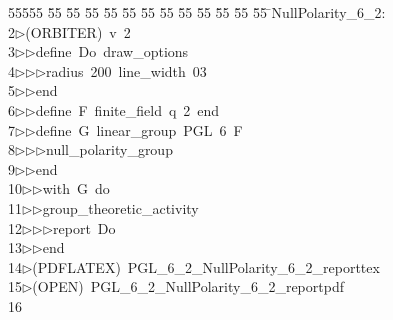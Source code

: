%
%
\begin{tabbing}
55555 \= 55 \= 55 \= 55 \= 55 \= 55 \= 55 \= 55 \= 55 \= 55 \= 55 \= 55 \= 55 \= \>NullPolarity\_6\_2:\\[0pt]
2\>$\triangleright$\>(ORBITER)\ v\ 2\ \\[0pt]
3\>$\triangleright$\>$\triangleright$\>define\ Do\ draw\_options\ \\[0pt]
4\>$\triangleright$\>$\triangleright$\>$\triangleright$\>radius\ 200\ line\_width\ 03\ \\[0pt]
5\>$\triangleright$\>$\triangleright$\>end\ \\[0pt]
6\>$\triangleright$\>$\triangleright$\>define\ F\ finite\_field\ q\ 2\ end\ \\[0pt]
7\>$\triangleright$\>$\triangleright$\>define\ G\ linear\_group\ PGL\ 6\ F\ \\[0pt]
8\>$\triangleright$\>$\triangleright$\>$\triangleright$\>null\_polarity\_group\ \\[0pt]
9\>$\triangleright$\>$\triangleright$\>end\ \\[0pt]
10\>$\triangleright$\>$\triangleright$\>with\ G\ do\ \\[0pt]
11\>$\triangleright$\>$\triangleright$\>group\_theoretic\_activity\ \\[0pt]
12\>$\triangleright$\>$\triangleright$\>$\triangleright$\>report\ Do\ \\[0pt]
13\>$\triangleright$\>$\triangleright$\>end\\[0pt]
14\>$\triangleright$\>(PDFLATEX)\ PGL\_6\_2\_NullPolarity\_6\_2\_reporttex\\[0pt]
15\>$\triangleright$\>(OPEN)\ PGL\_6\_2\_NullPolarity\_6\_2\_reportpdf\\[0pt]
16\>\end{tabbing}
